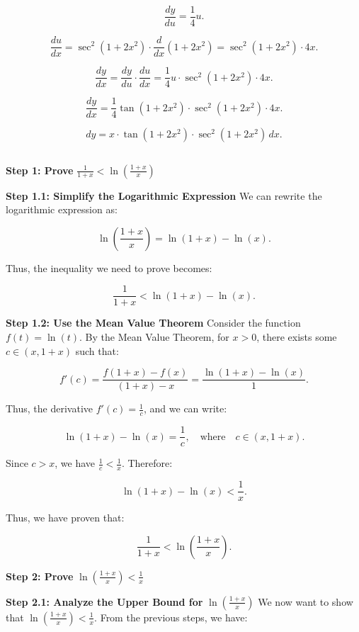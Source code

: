\documentclass{article}
\begin{document}
\[
\frac{dy}{du} = \frac{1}{4} u.
\]


\[
\frac{du}{dx} = \sec^2(1 + 2x^2) \cdot \frac{d}{dx}(1 + 2x^2) = \sec^2(1 + 2x^2) \cdot 4x.
\]


\[
\frac{dy}{dx} = \frac{dy}{du} \cdot \frac{du}{dx} = \frac{1}{4} u \cdot \sec^2(1 + 2x^2) \cdot 4x.
\]



\[
\frac{dy}{dx} = \frac{1}{4} \tan(1 + 2x^2) \cdot \sec^2(1 + 2x^2) \cdot 4x.
\]

\[
dy = x \cdot \tan(1 + 2x^2) \cdot \sec^2(1 + 2x^2) \, dx.
\]

\subsection{}

\textbf{Step 1: Prove} \( \frac{1}{1+x} < \ln\left(\frac{1+x}{x}\right) \)

\textbf{Step 1.1: Simplify the Logarithmic Expression}
We can rewrite the logarithmic expression as:

\[
\ln\left(\frac{1+x}{x}\right) = \ln(1+x) - \ln(x).
\]

Thus, the inequality we need to prove becomes:

\[
\frac{1}{1+x} < \ln(1+x) - \ln(x).
\]

\textbf{Step 1.2: Use the Mean Value Theorem}
Consider the function \( f(t) = \ln(t) \). By the Mean Value Theorem, for \( x > 0 \), there exists some \( c \in (x, 1+x) \) such that:

\[
f'(c) = \frac{f(1+x) - f(x)}{(1+x) - x} = \frac{\ln(1+x) - \ln(x)}{1}.
\]

Thus, the derivative \( f'(c) = \frac{1}{c} \), and we can write:

\[
\ln(1+x) - \ln(x) = \frac{1}{c}, \quad \text{where} \quad c \in (x, 1+x).
\]

Since \( c > x \), we have \( \frac{1}{c} < \frac{1}{x} \). Therefore:

\[
\ln(1+x) - \ln(x) < \frac{1}{x}.
\]

Thus, we have proven that:

\[
\frac{1}{1+x} < \ln\left(\frac{1+x}{x}\right).
\]

\textbf{Step 2: Prove} \( \ln\left(\frac{1+x}{x}\right) < \frac{1}{x} \)

\textbf{Step 2.1: Analyze the Upper Bound for} \( \ln\left(\frac{1+x}{x}\right) \)
We now want to show that \( \ln\left(\frac{1+x}{x}\right) < \frac{1}{x} \). From the previous steps, we have:
\end{document}

